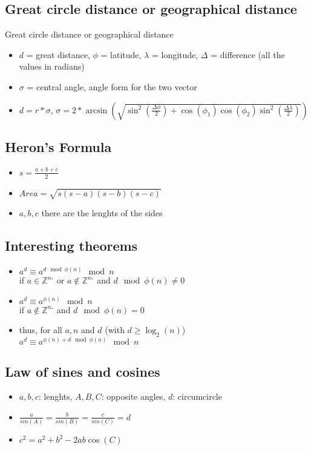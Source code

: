 \documentclass[10pt,letterpaper,twocolumn,twosided]{article}
\begin{document}
\subsection{Great circle distance or geographical distance}
Great circle distance or geographical distance
\begin{itemize}
\item $d$ = great distance, $\phi$ = latitude, $\lambda$ = longitude, $\Delta$ = difference (all the values in radians)
\item $\sigma$ = central angle, angle form for the two vector
\item $d = r * \sigma$, $\sigma = 2 * \arcsin(\sqrt{\sin^2(\frac{\Delta\phi}{2}) + \cos(\phi_1)\cos(\phi_2)\sin^2(\frac{\Delta\lambda}{2})})$
\end{itemize}


\subsection{Heron's Formula}
\begin{itemize}
\item $s = \frac{a+b+c}{2}$
\item $Area = \sqrt{s(s-a)(s-b)(s-c)}$
\item $a, b, c$ there are the lenghts of the sides
\end{itemize}


\subsection{Interesting theorems}
\begin{itemize}
\item $a^{d} \equiv a^{d \mod \phi(n)} \mod n$ \\
      if $a \in \mathbb{Z}^{n_{*}}$ or $a \notin \mathbb{Z}^{n_{*}}$ and $d \mod \phi(n) \neq 0$
\item $a^{d} \equiv a^{\phi(n)} \mod n$ \\
      if $a \notin \mathbb{Z}^{n_{*}}$ and $d \mod \phi(n) = 0$
\item thus, for all $a, n$ and $d$ (with $d \geq \log_2(n)$) \\
      $a^{d} \equiv a^{\phi(n) + d \mod \phi(n)} \mod n$
\end{itemize}


\subsection{Law of sines and cosines}
\begin{itemize}
\item $a, b, c$: lenghts, $A, B, C$: opposite angles, $d$: circumcircle
\item $\frac{a}{sin(A)} = \frac{b}{sin(B)} = \frac{c}{sin(C)} = d$
\item $c^2 = a^2 + b^2 - 2ab\cos(C)$
\end{itemize}
\end{document}
